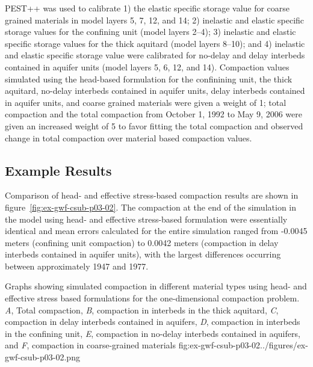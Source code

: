 PEST++ \citep{welter2015approaches} was used to calibrate 1) the elastic specific storage value for coarse grained materials in model layers 5, 7, 12, and 14; 2) inelastic and elastic specific storage values for the confining unit (model layers 2--4); 3) inelastic and elastic specific storage values for the thick aquitard (model layers 8--10); and 4) inelastic and elastic specific storage value were calibrated for no-delay and delay interbeds contained in aquifer units (model layers 5, 6, 12, and 14). Compaction values simulated using the head-based formulation for the confinining unit, the thick aquitard, no-delay interbeds contained in aquifer units, delay interbeds contained in aquifer units, and coarse grained materials were given a weight of 1; total compaction and the total compaction from October 1, 1992 to May 9, 2006 were given an increased weight of 5 to favor fitting the total compaction and observed change in total compaction over material based compaction values.  

\subsection{Example Results}

Comparison of head- and effective stress-based compaction results are shown in figure~\ref{fig:ex-gwf-csub-p03-02}. The compaction at the end of the simulation in the model using head- and effective stress-based formulation were essentially identical and mean errors calculated for the entire simulation ranged from -0.0045 meters (confining unit compaction) to 0.0042 meters (compaction in delay interbeds contained in aquifer units), with the largest differences occurring between approximately 1947 and 1977.

\begin{StandardFigure}{
                                      Graphs showing simulated compaction in different material types using head- 
                                      and effective stress based formulations for the one-dimensional compaction 
                                      problem. \textit{A}, Total compaction, \textit{B}, compaction in interbeds in the 
                                      thick aquitard, \textit{C}, compaction in delay interbeds contained in aquifers, 
                                      \textit{D}, compaction in interbeds in the confining unit, \textit{E}, compaction 
                                      in no-delay interbeds contained in aquifers, and \textit{F}, compaction in 
                                      coarse-grained materials
                                     }{fig:ex-gwf-csub-p03-02}{../figures/ex-gwf-csub-p03-02.png}
\end{StandardFigure}        

